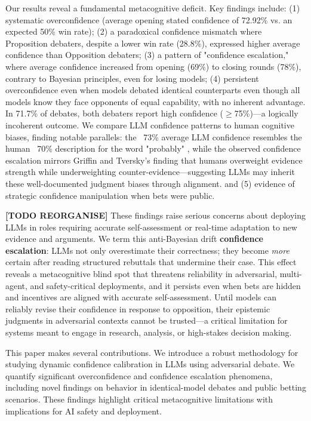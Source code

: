 \documentclass{article}
\begin{document}
Our results reveal a fundamental metacognitive deficit. Key findings include: (1) systematic overconfidence (average opening stated confidence of 72.92\% vs. an expected 50\% win rate); (2) a paradoxical confidence mismatch where Proposition debaters, despite a lower win rate (28.8\%), expressed higher average confidence than Opposition debaters; (3) a pattern of "confidence escalation," where average confidence increased from opening (69\%) to closing rounds (78\%), contrary to Bayesian principles, even for losing models; (4) persistent overconfidence even when models debated identical counterparts even though all models know they face opponents of equal capability, with no inherent advantage. In 71.7\% of debates, both debaters report high confidence ($\ge$75\%)—a logically incoherent outcome. We compare LLM confidence patterns to human cognitive biases, finding notable parallels: the ~73\% average LLM confidence resembles the human ~70\% description for the word "probably" \cite{Hashim2024,Mandel2019} , while the observed confidence escalation mirrors Griffin and Tversky's finding that humans overweight evidence strength  \cite{GriffinTversky1992} while underweighting counter-evidence—suggesting LLMs may inherit these well-documented judgment biases through alignment. and (5) evidence of strategic confidence manipulation when bets were public.


\textbf{[TODO REORGANISE]} These findings raise serious concerns about deploying LLMs in roles requiring accurate self-assessment or
real-time adaptation to new evidence and arguments. We term this anti-Bayesian drift \textbf{confidence
escalation}: LLMs not only overestimate their correctness; they become \emph{more} certain after reading
structured rebuttals that undermine their case. This effect reveals a metacognitive blind spot that threatens
reliability in adversarial, multi-agent, and safety-critical deployments, and it persists even when bets are
hidden and incentives are aligned with accurate self-assessment. Until models can reliably revise their
confidence in response to opposition, their epistemic judgments in adversarial contexts cannot be trusted—a
critical limitation for systems meant to engage in research, analysis, or high-stakes decision making.

This paper makes several contributions. We introduce a robust methodology for studying dynamic confidence calibration in LLMs using adversarial debate. We quantify significant overconfidence and confidence escalation phenomena, including novel findings on behavior in identical-model debates and public betting scenarios. These findings highlight critical metacognitive limitations with implications for AI safety and deployment.
\end{document}
